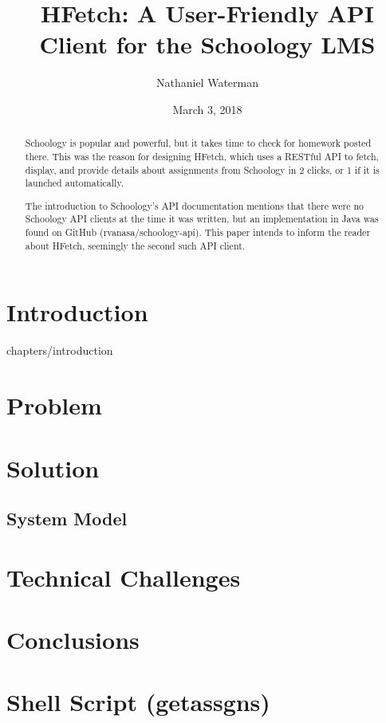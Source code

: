 \documentclass[twoside,a4paper,12pt]{report}
\title{HFetch: A User-Friendly API Client for the Schoology LMS}
\author{Nathaniel Waterman}
\date{March 3, 2018}
\begin{document}
\maketitle

\begin{abstract}
Schoology is popular and powerful, but it takes time to check for homework posted there.
This was the reason for designing HFetch,
	which uses a RESTful API to fetch, display, and provide details about
	assignments from Schoology in 2 clicks, or 1 if it is launched automatically.

The introduction to Schoology's API documentation mentions that there were no Schoology API clients at the time it was written, but an implementation in Java was found on GitHub (rvanasa/schoology-api).
This paper intends to inform the reader about HFetch, seemingly the second such API client.
\end{abstract}

\tableofcontents

\chapter{Introduction}
 {chapters/introduction}

\chapter{Problem}


\chapter{Solution}

\section{System Model}


\chapter{Technical Challenges}


\chapter{Conclusions}


\printbibliography

\appendix
\appendixpage
\addappheadtotoc
\chapter{Shell Script (getassgns)}

\end{document}

